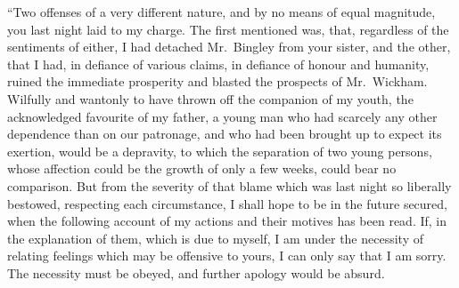 ``Two offenses of a very different nature, and by no means of
equal magnitude, you last night laid to my charge.  The first
mentioned was, that, regardless of the sentiments of either, I had
detached Mr.\ Bingley from your sister, and the other, that I had,
in defiance of various claims, in defiance of honour and
humanity, ruined the immediate prosperity and blasted the
prospects of Mr.\ Wickham.  Wilfully and wantonly to have
thrown off the companion of my youth, the acknowledged
favourite of my father, a young man who had scarcely any other
dependence than on our patronage, and who had been brought
up to expect its exertion, would be a depravity, to which the
separation of two young persons, whose affection could be the
growth of only a few weeks, could bear no comparison.  But
from the severity of that blame which was last night so liberally
bestowed, respecting each circumstance, I shall hope to be in the
future secured, when the following account of my actions and
their motives has been read.  If, in the explanation of them,
which is due to myself, I am under the necessity of relating
feelings which may be offensive to yours, I can only say that I
am sorry.  The necessity must be obeyed, and further apology
would be absurd.

